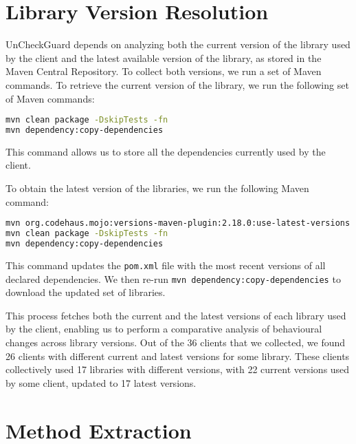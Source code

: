 \section{Library Version Resolution}


UnCheckGuard depends on analyzing both the current version of the library used by the client and the latest available version of the library, as stored in the Maven Central Repository. To collect both versions, we run a set of Maven commands. To retrieve the current version of the library, we run the following set of Maven commands:

\begin{lstlisting}[language=bash]
mvn clean package -DskipTests -fn
mvn dependency:copy-dependencies
\end{lstlisting}

This command allows us to store all the dependencies currently used by the client.

To obtain the latest version of the libraries, we run the following Maven command:
\begin{lstlisting}[language=bash]
mvn org.codehaus.mojo:versions-maven-plugin:2.18.0:use-latest-versions
mvn clean package -DskipTests -fn
mvn dependency:copy-dependencies
\end{lstlisting}
This command updates the \texttt{pom.xml} file with the most recent versions of all declared dependencies. We then re-run \texttt{mvn dependency:copy-dependencies} to download the updated set of libraries.

This process fetches both the current and the latest versions of each library used by the client, enabling us to perform a comparative analysis of behavioural changes across library versions. Out of the 36 clients that we collected, we found 26 clients with different current and latest versions for some library. These clients collectively used 17 libraries with different versions, with 22 current versions used by some client, updated to 17 latest versions.

\section{Method Extraction}

